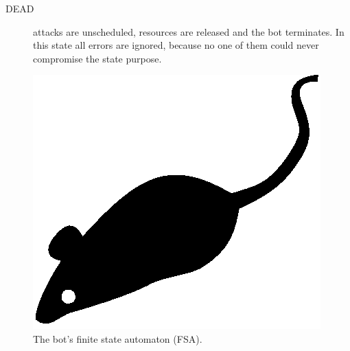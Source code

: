 \begin{description}
  \item[DEAD] attacks are unscheduled, resources are released and the bot terminates. In this state all errors are ignored, because no one of them could never compromise the state purpose.

  \medskip
  \medskip

\end{description}

\begin{figure}[tp]
  \centering
  \includegraphics{./fig/acmlarge-mouse}
  \caption{The bot's finite state automaton (FSA).}
    \label{fig:bot-fsa}
\end{figure}
